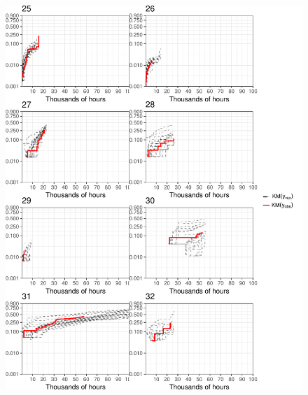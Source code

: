 \documentclass[12pt]{article}
\begin{document}
\begin{figure}[H]
\includegraphics[width=\textwidth]{ppcheck-4.pdf}
\end{figure}
\end{document}

